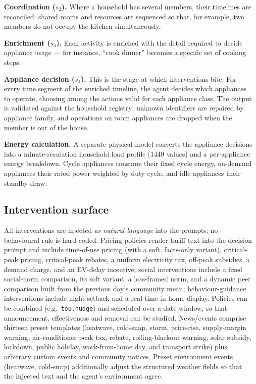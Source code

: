 \documentclass[11pt]{article}
\begin{document}
\textbf{Coordination ($s_2$).} Where a household has several members, their timelines are reconciled:
shared rooms and resources are sequenced so that, for example, two members do not occupy the kitchen
simultaneously.

\textbf{Enrichment ($s_3$).} Each activity is enriched with the detail required to decide appliance usage
--- for instance, ``cook dinner'' becomes a specific set of cooking steps.

\textbf{Appliance decision ($s_4$).} This is the stage at which interventions bite. For every time segment
of the enriched timeline, the agent decides which appliances to operate, choosing among the actions valid
for each appliance class. The output is validated against the household registry: unknown identifiers are
repaired by appliance family, and operations on room appliances are dropped when the member is out of the
house.

\textbf{Energy calculation.} A separate physical model converts the appliance decisions into a
minute-resolution household load profile (1440 values) and a per-appliance energy breakdown. Cycle
appliances consume their fixed cycle energy, on-demand appliances their rated power weighted by duty
cycle, and idle appliances their standby draw.

\subsection{Intervention surface}
All interventions are injected \emph{as natural language} into the prompts; no behavioural rule is
hard-coded. Pricing policies render tariff text into the decision prompt and include time-of-use pricing
(with a soft, facts-only variant), critical-peak pricing, critical-peak rebates, a uniform electricity
tax, off-peak subsidies, a demand charge, and an EV-delay incentive; social interventions include a fixed
social-norm comparison, its soft variant, a loss-framed norm, and a dynamic peer comparison built from the
previous day's community mean; behaviour-guidance interventions include night setback and a real-time
in-home display. Policies can be combined (e.g.\ \texttt{tou,nudge}) and scheduled over a date window, so
that announcement, effectiveness and removal can be studied. News/events comprise thirteen preset
templates (heatwave, cold-snap, storm, price-rise, supply-margin warning, air-conditioner peak tax,
rebate, rolling-blackout warning, solar subsidy, lockdown, public holiday, work-from-home day, and
transport strike) plus arbitrary custom events and community notices. Preset environment events
(heatwave, cold-snap) additionally adjust the structured weather fields so that the injected text and the
agent's environment agree.
\end{document}
